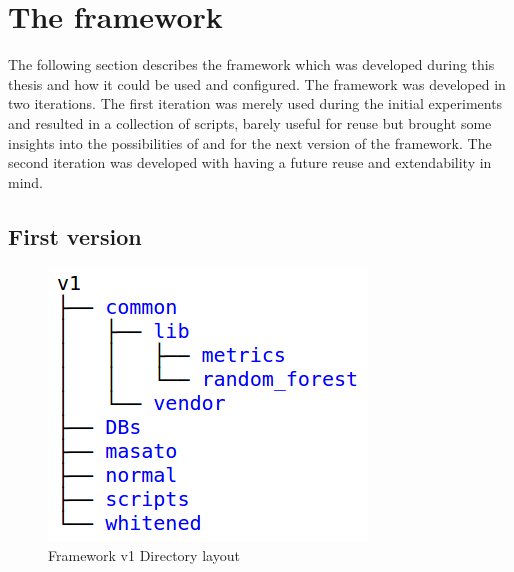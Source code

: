 
\section{The framework}
\label{sec:framework}

The following section describes the framework which was developed during this thesis and how it could be used and configured. The framework was developed in two iterations. The first iteration was merely used during the initial experiments and resulted in a collection of \MATLAB scripts, barely useful for reuse but brought some insights into the possibilities of \MATLAB and for the next version of the framework. The second iteration was developed with having a future reuse and extendability in mind.

\subsection{First version}

\begin{figure}
\includegraphics[width=\textwidth]{content/pictures/v1_dirs.png}
\caption{Framework v1 Directory layout}
\label{fig:framework_v1_dirs}
\end{figure}

